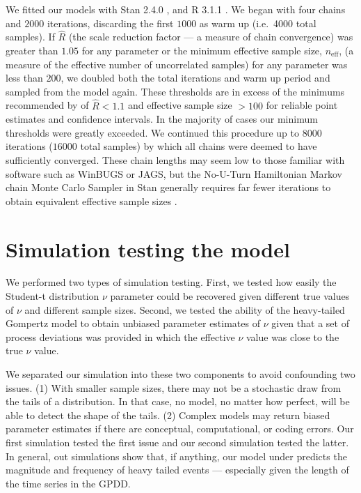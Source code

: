 We fitted our models with Stan 2.4.0 \citep{stan-manual2014}, and R 3.1.1
\citep{r2014}. We began with four chains and $2000$ iterations, discarding the
first $1000$ as warm up (i.e.~4000 total samples). If $\hat{R}$ (the scale
reduction factor --- a measure of chain convergence) was greater than $1.05$
for any parameter or the minimum effective sample size, $n_\mathrm{eff}$, (a
measure of the effective number of uncorrelated samples) for any parameter was
less than $200$, we doubled both the total iterations and warm up period and
sampled from the model again. These thresholds are in excess of the minimums
recommended by \citet{gelman2006a} of $\hat{R} < 1.1$ and effective sample size
$> 100$ for reliable point estimates and confidence intervals. In the majority
of cases our minimum thresholds were greatly exceeded. We continued this
procedure up to $8000$ iterations ($16000$ total samples) by which all chains
were deemed to have sufficiently converged. These chain lengths may seem low to
those familiar with software such as WinBUGS or JAGS, but the No-U-Turn
Hamiltonian Markov chain Monte Carlo Sampler in Stan generally requires far
fewer iterations to obtain equivalent effective sample sizes \citep{stan-manual2014}.

\section{Simulation testing the model}

We performed two types of simulation testing. First, we tested how easily the
Student-t distribution $\nu$ parameter could be recovered given different true
values of $\nu$ and different sample sizes. Second, we tested the ability of the
heavy-tailed Gompertz model to obtain unbiased parameter estimates of $\nu$
given that a set of process deviations was provided in which the effective
$\nu$ value was close to the true $\nu$ value.

We separated our simulation into these two components to avoid confounding two
issues. (1) With smaller sample sizes, there may not be a stochastic draw from
the tails of a distribution. In that case, no model, no matter how perfect,
will be able to detect the shape of the tails. (2) Complex models may return
biased parameter estimates if there are conceptual, computational, or coding
errors. Our first simulation tested the first issue and our second simulation
tested the latter. In general, out simulations show that, if anything, our
model under predicts the magnitude and frequency of heavy tailed events ---
especially given the length of the time series in the GPDD.


